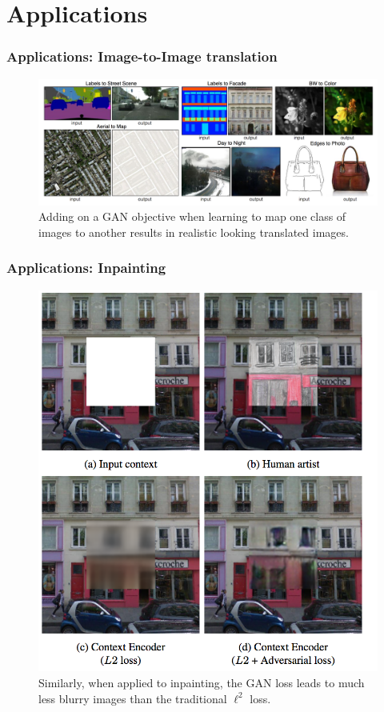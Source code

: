 \documentclass[10pt,mathserif]{beamer}
\begin{document}
\section{Applications}
\label{sec:applications}

\begin{frame}
  \frametitle{Applications: Image-to-Image translation}
\begin{figure}[ht]
  \centering
  \includegraphics[width=0.9\paperwidth]{figure/image_to_image}
  \caption{Adding on a GAN objective when learning to map one class of images to
    another results in realistic looking translated
    images. \label{fig:image_to_image} }
\end{figure}
\end{frame}

\begin{frame}
  \frametitle{Applications: Inpainting}
\begin{figure}[ht]
  \centering
  \includegraphics[width=0.45\paperwidth]{figure/inpainting}
  \caption{Similarly, when applied to inpainting, the GAN loss leads to much
    less blurry images than the traditional $\ell^{2}$
    loss. \label{fig:inpainting} }
\end{figure}
\end{frame}
\end{document}
